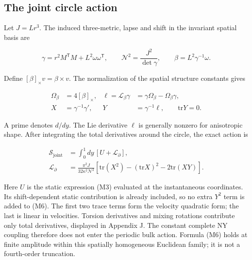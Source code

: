 \subsection{The joint circle action}

Let $J=Lr^3$. The induced three-metric, lapse and shift in the invariant spatial basis are

\begin{equation}\tag{M4}\label{eq:M4}
\gamma=r^2M^{\mathsf T}M+L^2\omega\omega^{\mathsf T},
\qquad \mathcal N^2=\frac{J^2}{\det\gamma},
\qquad \beta=L^2\gamma^{-1}\omega.
\end{equation}

Define $[\beta]_\times v=\beta\times v$. The normalization of the spatial structure constants gives

\begin{equation}\tag{M5}\label{eq:M5}
\begin{aligned}
\Omega_\beta&=4[\beta]_\times,&
\ell=\mathcal L_\beta\gamma&=\gamma\Omega_\beta-\Omega_\beta\gamma,\\
X&=\gamma^{-1}\gamma',&
Y&=\gamma^{-1}\ell,\qquad \mathrm{tr}Y=0.
\end{aligned}
\end{equation}

A prime denotes $d/dy$. The Lie derivative $\ell$ is generally nonzero for anisotropic shape. After integrating the total derivatives around the circle, the exact action is

\begin{equation}\tag{M6}\label{eq:M6}
\begin{aligned}
\mathcal S_{\mathrm{joint}}
&=\int_0^1dy\,[U+\mathcal L_{\partial}],\\
\mathcal L_{\partial}
&=\frac{\pi^2J}{32\kappa^2\mathcal N^2}
\left[\mathrm{tr}(X^2)-(\mathrm{tr}X)^2-2\mathrm{tr}(XY)\right].
\end{aligned}
\end{equation}

Here $U$ is the static expression (M3) evaluated at the instantaneous coordinates. Its shift-dependent static contribution is already included, so no extra $Y^2$ term is added to (M6). The first two trace terms form the velocity quadratic form; the last is linear in velocities. Torsion derivatives and mixing rotations contribute only total derivatives, displayed in Appendix J. The constant complete NY coupling therefore does not enter the periodic bulk action. Formula (M6) holds at finite amplitude within this spatially homogeneous Euclidean family; it is not a fourth-order truncation.
